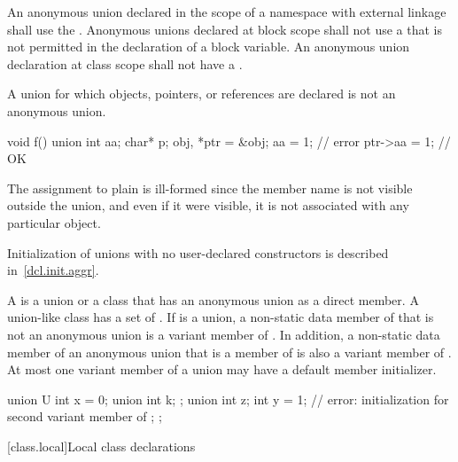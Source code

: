 \pnum
{}%
%
An anonymous union declared in the scope of a namespace with external linkage
shall use the  .
Anonymous unions declared at block scope shall not use a 
that is not permitted in the declaration of a block variable.
An anonymous union declaration at class scope shall not have
a .

\pnum
\begin{note}
A union for which objects, pointers, or references are declared is not an anonymous union.
\begin{example}
\begin{codeblock}
void f() {
  union { int aa; char* p; } obj, *ptr = &obj;
  aa = 1;           // error
  ptr->aa = 1;      // OK
}
\end{codeblock}

The assignment to plain  is ill-formed since the member name
is not visible outside the union, and even if it were visible, it is not
associated with any particular object.
\end{example}
\end{note}
\begin{note}
Initialization of unions with no user-declared constructors is described
in~\ref{dcl.init.aggr}.
\end{note}

\pnum
{}%
A  is a union or a class that has an anonymous union as a direct
member. A union-like class  has a set of .
If  is a union, a non-static data member of  that is not an anonymous
union is a variant member of . In addition, a non-static data member of an
anonymous union that is a member of  is also a variant member of .
At most one variant member of a union may have a default member initializer.
\begin{example}
\begin{codeblock}
union U {
  int x = 0;
  union {
    int k;
  };
  union {
    int z;
    int y = 1;      // error: initialization for second variant member of 
  };
};
\end{codeblock}
\end{example}

[class.local]{Local class declarations}
%
%
%

